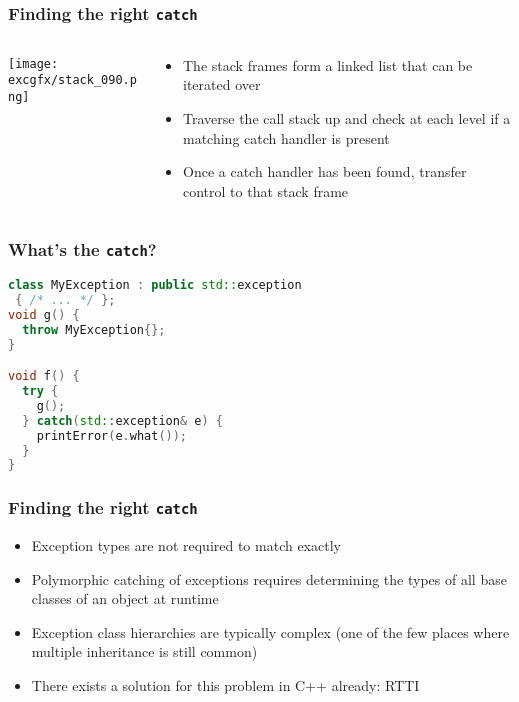 \documentclass[aspectratio=169]{beamer}
\newif\iftransitions
\newcommand{\cpause}{\iftransitions \pause \fi}
\begin{document}
\begin{frame}
  \frametitle{Finding the right \texttt{catch}}

    \begin{columns}
    \begin{column}{.5\textwidth}
      \texttt{[image: excgfx/stack\_090.png]}
    \end{column}

    \begin{column}{.5\textwidth}
      \begin{itemize}
      \item The stack frames form a linked list that can be iterated over
      \item Traverse the call stack up and check at each level if a matching catch handler is present
      \item Once a catch handler has been found, transfer control to that stack frame
      \end{itemize}
    \end{column}
  \end{columns}
\end{frame}


\begin{frame}[fragile]
  \frametitle{What's the \texttt{catch}?}

  \begin{lstlisting}[language={C++}]
class MyException : public std::exception
 { /* ... */ };
void g() {
  throw MyException{};
}

void f() {
  try {
    g();
  } catch(std::exception& e) {
    printError(e.what());
  }
}
  \end{lstlisting}
\end{frame}


\begin{frame}
  \frametitle{Finding the right \texttt{catch}}

  \begin{itemize}
  \cpause \item Exception types are not required to match exactly
  \cpause \item Polymorphic catching of exceptions requires determining the types of all base classes of an object at runtime
  \cpause \item Exception class hierarchies are typically complex (one of the few places where multiple inheritance is still common)
  \cpause \item There exists a solution for this problem in C++ already: RTTI
  \end{itemize}
\end{frame}
\end{document}
